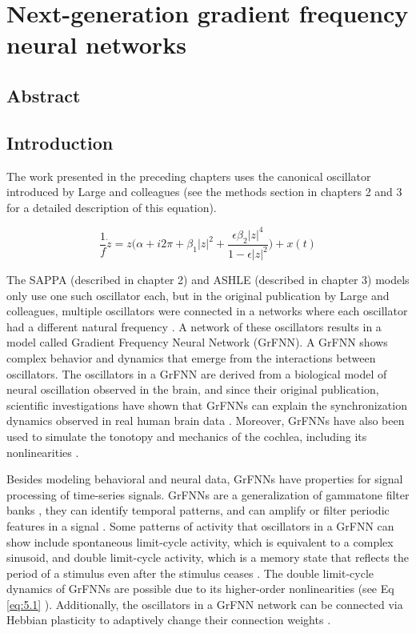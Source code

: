 \documentclass{report}
\begin{document}
\chapter{Next-generation gradient frequency neural networks}

\section{Abstract}

\section{Introduction}

The work presented in the preceding chapters uses the canonical oscillator introduced by Large and colleagues \cite{large2010canonical} (see the methods section in chapters 2 and 3 for a detailed description of this equation).  

\begin{equation}
\frac{1}{f}\dot{z} = z\bigg(\alpha + i2\pi + \beta_1|z|^2 + \frac{\epsilon\beta_2|z|^4}{1-\epsilon|z|^2}\bigg) + x(t) \label{eq:5.1}
\end{equation}

The SAPPA (described in chapter 2) and ASHLE (described in chapter 3) models only use one such oscillator each, but in the original publication by Large and colleagues, multiple oscillators were connected in a networks where each oscillator had a different natural frequency \cite{large2010canonical}. A network of these oscillators results in a model called Gradient Frequency Neural Network (GrFNN). A GrFNN shows complex behavior and dynamics that emerge from the interactions between oscillators. The oscillators in a GrFNN are derived from a biological model of neural oscillation observed in the brain, and since their original publication, scientific investigations have shown that GrFNNs can explain the synchronization dynamics observed in real human brain data \cite{tal2017neural}. Moreover, GrFNNs have also been used to simulate the tonotopy and mechanics of the cochlea, including its nonlinearities \cite{lerud2019canonical}.

Besides modeling behavioral and neural data, GrFNNs have properties for signal processing of time-series signals\cite{kim2015signal}. GrFNNs are a generalization of gammatone filter banks \cite{large2015learning}, they can identify temporal patterns, and can amplify or filter periodic features in a signal \cite{kim2015signal}. Some patterns of activity that oscillators in a GrFNN can show include spontaneous limit-cycle activity, which is equivalent to a complex sinusoid, and double limit-cycle activity, which is a memory state that reflects the period of a stimulus even after the stimulus ceases \cite{kim2015signal}. The double limit-cycle dynamics of GrFNNs are possible due to its higher-order nonlinearities (see Eq \eqref{eq:5.1} \cite{large2010canonical, kim2015signal}). Additionally, the oscillators in a GrFNN network can be connected via Hebbian plasticity to adaptively change their connection weights \cite{lambert2016adaptive, kim2017dynamical}. 
\end{document}
